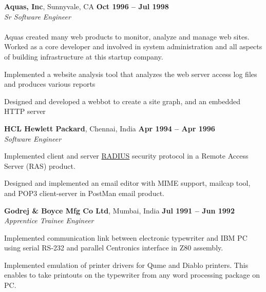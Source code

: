 \documentclass[margin,line]{resume}
\begin{document}
\begin{resume}
    \textbf{Aquas, Inc}, Sunnyvale, CA \hfill \textbf{Oct 1996 -- Jul 1998}\\ 
    \textsl{Sr Software Engineer}\\\\ 
Aquas created many web products to monitor, analyze and manage web sites. Worked as a core developer and involved in system administration and all aspects of building infrastructure at this startup company.
    \begin{list2}
    \item Implemented a website analysis tool that analyzes the web server access log files and produces various reports
    \item Designed and developed a webbot to create a site graph, and an embedded HTTP server
    \end{list2}\vspace{-1.5mm}


    \textbf{HCL Hewlett Packard}, Chennai, India \hfill \textbf{Apr 1994 -- Apr 1996}\\
    \textsl{Software Engineer}\\
    \begin{list2}
    \item Implemented client and server \href{http://www.ietf.org/rfc/rfc2865.txt}{RADIUS} security protocol in a Remote Access Server (RAS) product.
    \item Designed and implemented an email editor with MIME support, mailcap tool, and POP3 client-server in PostMan email product.
    \end{list2}\vspace{-1.5mm}


    \textbf{Godrej \& Boyce Mfg Co Ltd}, Mumbai, India \hfill \textbf{Jul 1991 -- Jun 1992}\\
    \textsl{Apprentice Trainee Engineer}\\ 
    \begin{list2}
    \item Implemented communication link between electronic typewriter and IBM PC using serial RS-232 and parallel Centronics interface in Z80 assembly.
    \item Implemented emulation of printer drivers for Qume and Diablo printers. This enables to take printouts on the typewriter from any word processing package on PC.
    \end{list2}\vspace{-1.5mm}

\end{resume}
\end{document}
